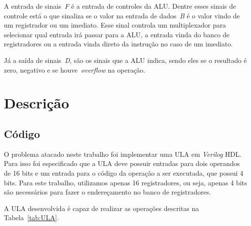 \documentclass[11pt,a4paper,titlepage]{article}
\begin{document}
A entrada de sinais~\textit{F} é a entrada de controles da ALU.
Dentre esses sinais de controle está o que sinaliza se o valor na entrada de dados~\textit{B} é o valor vindo de um registrador ou um imediato.
Esse sinal controla um multiplexador para selecionar qual entrada irá passar para a ALU, a entrada vinda do banco de registradores ou a entrada vinda direto da instrução no caso de um imediato.

Já a saída de sinais~\textit{D}, são os sinais que a ALU indica, sendo eles se o resultado é zero, negativo e se houve~\textit{overflow} na operação.

\section{Descrição}\label{sec:desc}

\subsection{Código}\label{subsec:codigo}

O problema atacado neste trabalho foi implementar uma ULA em \textit{Verilog} HDL.
Para isso foi especificado que a ULA deve possuir entradas para dois operandos de 16 bits e um entrada para o código da operação a ser executada, que possui 4 bits.
Para este trabalho, utilizamos apenas 16 registradores, ou seja, apenas 4 bits são necessários para fazer o endereçamento no banco de registradores.

A ULA desenvolvida é capaz de realizar as operações descritas na Tabela~\ref{tab:ULA}.
\end{document}
